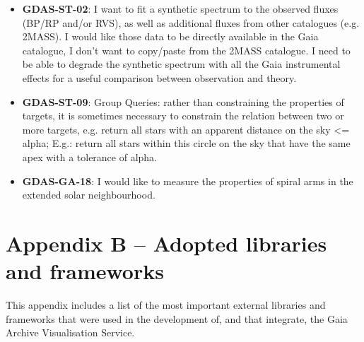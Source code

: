 \documentclass[longauth, final]{aa}
\begin{document}
\begin{itemize}
\item{\bf GDAS-ST-02}: I want to fit a synthetic spectrum to the observed fluxes (BP/RP and/or RVS), as well as additional fluxes from other catalogues (e.g. 2MASS). I would like those data to be directly available in the Gaia catalogue, I don't want to copy/paste from the 2MASS catalogue. I need to be able to degrade the synthetic spectrum with all the Gaia instrumental effects for a useful comparison between observation and theory. 

\item{\bf GDAS-ST-09}: Group Queries: rather than constraining the properties of targets, it is sometimes necessary to constrain the relation between two or more targets, e.g. return all stars with an apparent distance on the sky <= alpha; E.g.: return all stars within this circle on the sky that have the same apex with a tolerance of alpha. 

\item{\bf GDAS-GA-18}: I would like to measure the properties of spiral arms in the extended solar neighbourhood.
\end{itemize}



\section{Appendix B -- Adopted libraries and frameworks}

This appendix includes a list of the most important external libraries and frameworks that were used in the development of, and that integrate,  the Gaia Archive Visualisation Service. 
\end{document}
